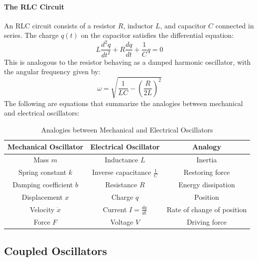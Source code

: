 \documentclass[11pt]{report}
\begin{document}
\paragraph{The RLC Circuit} An RLC circuit consists of a resistor \( R \), inductor \( L \), and capacitor \( C \) connected in series. The charge \( q(t) \) on the capacitor satisfies the differential equation:
\begin{equation}\label{eq:RLC_ode}
    L\frac{d^2q}{dt^2} + R\frac{dq}{dt} + \frac{1}{C}q = 0
\end{equation}
This is analogous to the resistor behaving as a damped harmonic oscillator, with the angular frequency given by:
\begin{equation}\label{eq:RLC_omega}
    \omega = \sqrt{\frac{1}{LC} - \left(\frac{R}{2L}\right)^2}
\end{equation}
The following are equations that summarize the analogies between mechanical and electrical oscillators:
\begin{table}[h!]
    \centering
    \begin{tabular}{|c|c|c|}
        \hline
        \textbf{Mechanical Oscillator} & \textbf{Electrical Oscillator} & \textbf{Analogy} \\
        \hline
        Mass \( m \) & Inductance \( L \) & Inertia \\
        Spring constant \( k \) & Inverse capacitance \( \frac{1}{C} \) & Restoring force \\
        Damping coefficient \( b \) & Resistance \( R \) & Energy dissipation \\
        Displacement \( x \) & Charge \( q \) & Position \\
        Velocity \( \dot{x} \) & Current \( I = \frac{dq}{dt} \) & Rate of change of position \\
        Force \( F \) & Voltage \( V \) & Driving force \\
        \hline
    \end{tabular}
    \caption{Analogies between Mechanical and Electrical Oscillators}
    \label{tab:oscillator_analogies}
\end{table}

\subsection{Coupled Oscillators}
\end{document}
